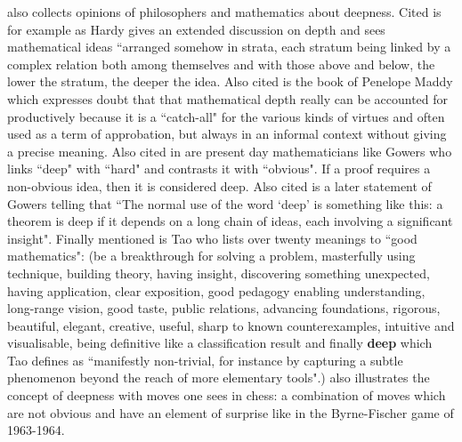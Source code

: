 \documentclass[12pt]{amsart}
\newcounter{example}    \def\example#1{ \item \fontsize{12}{15} \selectfont #1 \fontsize{12}{15} \selectfont }
\begin{document}
\cite{Urquhart2015} also collects opinions of philosophers and mathematics about deepness.
Cited is for example \cite{HardyApology} as Hardy gives an extended discussion on depth and
sees mathematical ideas ``arranged somehow in strata, each stratum being linked by a complex
relation both among themselves and with those above and below, the lower the stratum, the deeper
the idea. Also cited is the book of Penelope Maddy \cite{Maddy2011} which expresses 
doubt that that mathematical depth really can be accounted for productively because 
it is a ``catch-all" for the various kinds of virtues
and often used as a term of approbation, but always in an informal context without giving a precise
meaning. Also cited in \cite{Urquhart2015} are present day mathematicians like Gowers
\cite{Gowers2008} who links ``deep" with ``hard" 
and contrasts it with ``obvious". If a proof requires a non-obvious
idea, then it is considered deep. Also cited is a later statement of Gowers telling that
``The normal use of the word `deep' is something like this: a theorem is deep if
it depends on a long chain of ideas, each involving a significant insight".
Finally mentioned is Tao \cite{Tao2007} who lists over twenty meanings to ``good mathematics":
(be a breakthrough for solving a problem, masterfully using technique,
building theory, having insight, discovering something unexpected, having
application, clear exposition, good pedagogy enabling understanding,
long-range vision, good taste, public relations, advancing foundations,
rigorous, beautiful, elegant, creative, useful, sharp to known
counterexamples, intuitive and visualisable, being definitive like a
classification result and finally {\bf deep} which Tao defines as ``manifestly
non-trivial, for instance by capturing a subtle phenomenon beyond the
reach of more elementary tools".)  \cite{Urquhart2015}  also illustrates
the concept of deepness with moves one sees in chess: a combination of moves which are not obvious
and have an element of surprise like in the Byrne-Fischer game of 1963-1964. \\
\end{document}

